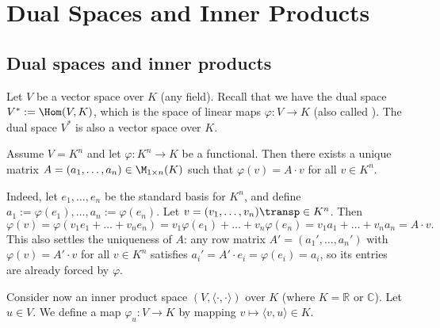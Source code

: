 \renewcommand{\thetheorem}{23.a.\arabic{theorem}}
\setcounter{theorem}{0}
\setcounter{chapter}{22}

\chapter{Dual Spaces and Inner Products}

\section{Dual spaces and inner products}

Let $V$ be a vector space over $K$ (any field). Recall that we have the dual space $V^* := \Hom(V, K)$, which is the space of linear maps $\varphi \colon V \to K$ (also called ). The dual space $V^*$ is also a vector space over $K$.

\begin{warmup}
Assume $V = K^n$ and let $\varphi \colon K^n \to K$ be a functional. Then there exists a unique matrix $A = (a_1, \dots, a_n) \in \M_{1 \times n}(K)$ such that $\varphi(v) = A \cdot v$ for all $v \in K^n$.

Indeed, let $e_1, \dots, e_n$ be the standard basis for $K^n$, and define $a_1 := \varphi(e_1), \dots, a_n := \varphi(e_n)$. Let $v = (v_1, \dots, v_n)\transp \in K^n$. Then
\[
    \varphi(v) = \varphi(v_1 e_1 + \dots + v_n e_n) = v_1 \varphi(e_1) + \dots + v_n \varphi(e_n) = v_1 a_1 + \dots + v_n a_n = A \cdot v.
\]
This also settles the uniqueness of $A$: any row matrix $A' = (a_1', \dots, a_n')$ with $\varphi(v) = A' \cdot v$ for all $v \in K^n$ satisfies $a_i' = A' \cdot e_i = \varphi(e_i) = a_i$, so its entries are already forced by $\varphi$.
\end{warmup}

Consider now an inner product space $(V, \langle \cdot, \cdot \rangle)$ over $K$ (where $K = \mathbb{R}$ or $\mathbb{C}$). Let $u \in V$. We define a map $\varphi_u \colon V \to K$ by mapping $v \mapsto \langle v, u \rangle \in K$.

